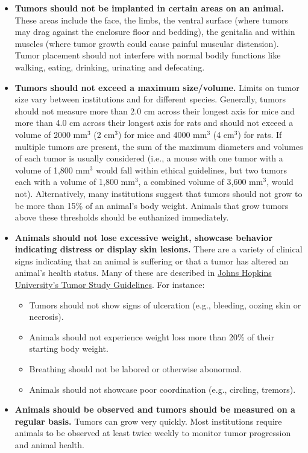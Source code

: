 \documentclass[letterpaper, 12pt]{article}
\begin{document}
\begin{itemize}
    \setlength\itemsep{-0.5em}
    \item \textbf{Tumors should not be implanted in certain areas on an animal.} These areas include the face, the limbs, the ventral surface (where tumors may drag against the enclosure floor and bedding), the genitalia and within muscles (where tumor growth could cause painful muscular distension). Tumor placement should not interfere with normal bodily functions like walking, eating, drinking, urinating and defecating.
    \item \textbf{Tumors should not exceed a maximum size/volume.} Limits on tumor size vary between institutions and for different species. Generally, tumors should not measure more than 2.0 cm across their longest axis for mice and more than 4.0 cm across their longest axis for rats and should not exceed a volume of 2000 mm$^3$ (2 cm$^3$) for mice and 4000 mm$^3$ (4 cm$^3$) for rats. If multiple tumors are present, the sum of the maximum diameters and volumes of each tumor is usually considered (i.e., a mouse with one tumor with a volume of 1,800 mm$^3$ would fall within ethical guidelines, but two tumors each with a volume of 1,800 mm$^3$, a combined volume of 3,600 mm$^3$, would not). Alternatively, many institutions suggest that tumors should not grow to be more than 15\% of an animal's body weight. Animals that grow tumors above these thresholds should be euthanized immediately.
    \item \textbf{Animals should not lose excessive weight, showcase behavior indicating distress or display skin lesions.} There are a variety of clinical signs indicating that an animal is suffering or that a tumor has altered an animal's health status. Many of these are described in \href{https://animalcare.jhu.edu/wp-content/uploads/sites/5/Tumor-Study-Guidelines-in-Mice-and-Rats.pdf}{Johns Hopkins University's Tumor Study Guidelines}. For instance:
    \begin{itemize}
    \setlength\itemsep{-0.5em}
       \item Tumors should not show signs of ulceration (e.g., bleeding, oozing skin or necrosis).
       \item Animals should not experience weight loss more than 20\% of their starting body weight.
       \item Breathing should not be labored or otherwise abonormal.
       \item Animals should not showcase poor coordination (e.g., circling, tremors).
    \end{itemize}
    \item \textbf{Animals should be observed and tumors should be measured on a regular basis.} Tumors can grow very quickly. Most institutions require animals to be observed at least twice weekly to monitor tumor progression and animal health.
\end{itemize}
\end{document}
